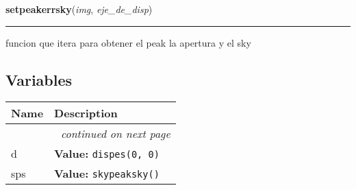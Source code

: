     \label{astroplot_s:setpeakerrsky}

    \vspace{0.5ex}

\hspace{.8\funcindent}\begin{boxedminipage}{\funcwidth}

    \raggedright \textbf{setpeakerrsky}(\textit{img}, \textit{eje\_de\_disp})

    \vspace{-1.5ex}

    \rule{\textwidth}{0.5\fboxrule}
\setlength{\parskip}{2ex}
    funcion que itera para obtener el peak la apertura y el sky

\setlength{\parskip}{1ex}
    \end{boxedminipage}



  \subsection{Variables}

    \vspace{-1cm}
\hspace{\varindent}\begin{longtable}{|p{\varnamewidth}|p{\vardescrwidth}|l}
\cline{1-2}
\cline{1-2} \centering \textbf{Name} & \centering \textbf{Description}& \\
\cline{1-2}
\endhead\cline{1-2}\multicolumn{3}{r}{\small\textit{continued on next page}}\\\endfoot\cline{1-2}
\endlastfoot\raggedright d\- & \raggedright \textbf{Value:} 
{\tt dispes(0, 0)}&\\
\cline{1-2}
\raggedright s\-p\-s\- & \raggedright \textbf{Value:} 
{\tt skypeaksky()}&\\
\cline{1-2}
\end{longtable}



